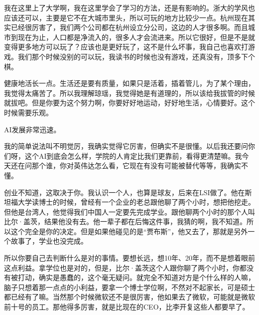 

我在这里上了大学啊，我在这里学会了学习的方法，还是有影响的。浙大的学风也应该还可以，主要是它不在大城市里头，所以可玩的地方比较少一点。杭州现在其实已经很厉害了，我们两个公司都在杭州设立分公司，这边的人才很多啊。而且城市到现在为止，人口都是净流入的，很多人才会流进来。所以它很好，但是不是就变得更多地方可以玩了？应该也是更好玩了，这不是什么坏事，我自己也喜欢打游戏。我们那个时候没别的可以玩，我读书的时候也没有游戏，还真没有，顶多下个棋。



健康地活长一点。生活还是要有质量，如果只是活着，插着管儿，为了某个理由，我觉得太痛苦了。所以我理解琼瑶，我觉得她是有道理的，所以该给我拔管的时候就拔吧。但是你要为这个努力啊，你要好好地运动，好好地生活，心情要好。这个时候需要乐观。



AI发展非常迅速。

我的简单说法叫不明觉厉，我确实觉得它厉害，但确实不是很懂。以后我还要问你们呀，这个AI到底会怎么样，学院的人肯定比我们更靠前，看得更清楚嘛。我今天还在问那个谁，你对英伟达怎么看，它现在有没有可能被替代等等，我确实不懂。



创业不知道，这取决于你。我认识一个人，也算是球友，后来在LSI做了。他在斯坦福大学读博士的时候，曾经有一个企业的老总跟他聊了两个小时，想把他挖走。但他是台湾人，他觉得我们中国人一定要先完成学业。跟他聊两个小时的那个人叫比尔·盖茨，结果他没有去。他一辈子都在后悔这件事，我猜的啊，我不知道。所以这个完全是你的决定。但是如果他碰见的是“贾布斯”，他又去了，那就是另外一个故事了，学业也没完成。

所以你要自己去判断什么是对的事情。要想长远，想10年、20年，而不是想着眼前这点利益。拿学位也是对的，但是，比尔·盖茨这个人跟你聊了两个小时，你都没有被打动，确实是愚蠢的，这个毫无疑问。就完全不知道对方是个什么样的人嘛，脑子只想着那一点点的小利益，要拿一个博士学位啊，不然对不起家长，可是硕士都已经有了嘛。当然那个时候微软还不是很厉害，他如果去了微软，可能就是微软前十号的员工。那他得多厉害，就是比现在的CEO，比李开复这些人都要早了。

